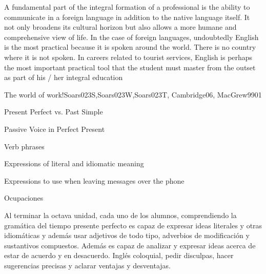 \begin{syllabus}

\begin{justification}
A fundamental part of the integral formation of a professional is the ability to communicate in a foreign language in addition to the native language itself.
It not only broadens its cultural horizon but also allows a more humane and comprehensive view of life. In the case of foreign languages, undoubtedly English is the most practical because it is spoken around the world. There is no country where it is not spoken. In careers related to tourist services, English is perhaps the most important practical tool that the student must master from the outset as part of his / her integral education
\end{justification}

\begin{outcomes}
\end{outcomes}

\begin{unit}{The world of work!}{Soars023S,Soars023W,Soars023T, Cambridge06, MacGrew99}{0}{1}
   \begin{topics}
      \item Present Perfect vs. Past Simple
      \item Passive Voice in Perfect Present
      \item Verb phrases
      \item Expressions of literal and idiomatic meaning
      \item Expressions to use when leaving messages over the phone
      \item Ocupaciones 
   \end{topics}

   \begin{unitgoals}
      \item Al terminar la octava unidad, cada uno de los alumnos, comprendiendo la gramática del tiempo presente perfecto es capaz de expresar ideas literales y otras idiomáticas y además usar adjetivos de todo tipo, adverbios de modificación y sustantivos compuestos. Además es capaz de analizar y expresar ideas acerca de estar de acuerdo y en desacuerdo. Inglés coloquial, pedir disculpas, hacer sugerencias precisas y aclarar ventajas y desventajas.
   \end{unitgoals}

\end{unit}


\end{syllabus}
